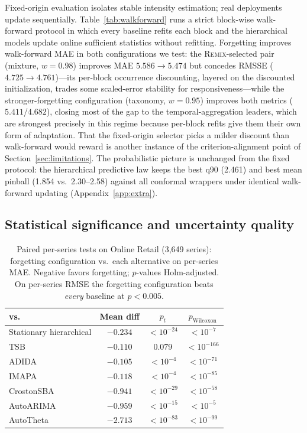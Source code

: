 \documentclass[twocolumn,10pt]{article}
\newcommand{\REMIX}{\textsc{Remix}}
\begin{document}
Fixed-origin evaluation isolates stable intensity estimation; real
deployments update sequentially. Table~\ref{tab:walkforward} runs a
strict block-wise walk-forward protocol in which every baseline refits
each block and the hierarchical models update online sufficient
statistics without refitting. Forgetting improves walk-forward MAE in
both configurations we test: the \REMIX{}-selected pair (mixture,
$w{=}0.98$) improves MAE $5.586\!\to\!5.474$ but concedes RMSSE
($4.725\!\to\!4.761$)---its per-block occurrence discounting, layered on
the discounted initialization, trades some scaled-error stability for
responsiveness---while the stronger-forgetting configuration (taxonomy,
$w{=}0.95$) improves both metrics ($5.411$/$4.682$), closing most of the
gap to the temporal-aggregation leaders, which are strongest precisely
in this regime because per-block refits give them their own form of
adaptation. That the fixed-origin selector picks a milder discount than
walk-forward would reward is another instance of the
criterion-alignment point of Section~\ref{sec:limitations}. The probabilistic picture
is unchanged from the fixed protocol: the hierarchical predictive law
keeps the best q90 (2.461) and best mean pinball (1.854 vs.\ 2.30--2.58)
against all conformal wrappers under identical walk-forward updating
(Appendix~\ref{app:extra}).

\subsection{Statistical significance and uncertainty quality}
\label{sec:significance}

\begin{table}[t]
\centering
\caption{Paired per-series tests on Online Retail (3{,}649 series):
forgetting configuration vs.\ each alternative on per-series MAE.
Negative favors forgetting; $p$-values Holm-adjusted. On per-series RMSE
the forgetting configuration beats \emph{every} baseline at $p<0.005$.}
\label{tab:significance}
\small
\setlength{\tabcolsep}{5pt}
\begin{tabular}{lccc}
\toprule
vs. & Mean diff & $p_t$ & $p_{\mathrm{Wilcoxon}}$\\
\midrule
Stationary hierarchical & $-0.234$ & $<\!10^{-24}$ & $<\!10^{-7}$\\
TSB & $-0.110$ & $0.079$ & $<\!10^{-166}$\\
ADIDA & $-0.105$ & $<\!10^{-4}$ & $<\!10^{-71}$\\
IMAPA & $-0.118$ & $<\!10^{-4}$ & $<\!10^{-85}$\\
CrostonSBA & $-0.941$ & $<\!10^{-29}$ & $<\!10^{-58}$\\
AutoARIMA & $-0.959$ & $<\!10^{-15}$ & $<\!10^{-5}$\\
AutoTheta & $-2.713$ & $<\!10^{-83}$ & $<\!10^{-99}$\\
\bottomrule
\end{tabular}
\end{table}
\end{document}
